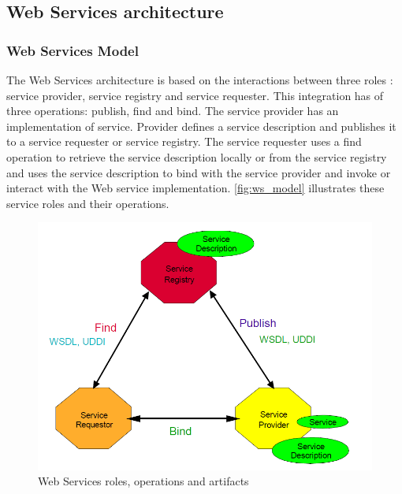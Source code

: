 \subsection{Web Services architecture}
\subsubsection{Web Services Model}
The Web Services architecture is based on the interactions between three
roles \cite{Kreger2001-WSC}:
service provider, service registry and service requester. 
This integration has of three operations: publish, find and
bind. The service provider has an implementation of service. Provider defines a
service description and publishes it to a service requester or service registry.
The service requester uses a find operation to retrieve the service
description locally or from the service registry and uses the service description to bind with the
service provider and invoke or interact with the Web service implementation.
\autoref{fig:ws_model} illustrates these service roles and their operations.


\begin{center}
 \begin{figure}[H]
	\includegraphics[width=\textwidth]{../images/background/ws_model.png}
	\caption{Web Services roles, operations and artifacts \cite{Kreger2001-WSC}}
	\label{fig:ws_model}
 \end{figure}
\end{center}

